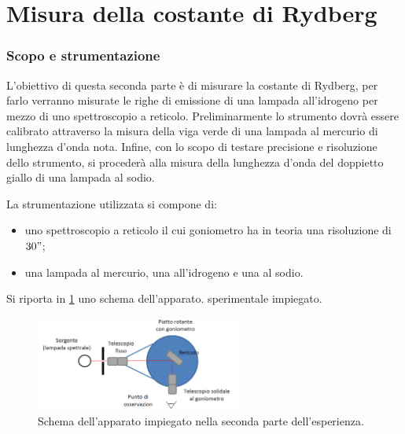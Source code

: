 \part{Misura della costante di Rydberg}
\section{Scopo e strumentazione}
	L'obiettivo di questa seconda parte è di misurare la costante di Rydberg, per farlo verranno misurate le righe di emissione di una lampada all'idrogeno per mezzo di uno spettroscopio a reticolo. Preliminarmente lo strumento dovrà essere calibrato attraverso la misura della viga verde di una lampada al mercurio di lunghezza d'onda nota.
	Infine, con lo scopo di testare precisione e risoluzione dello strumento, si procederà alla misura della lunghezza d'onda del doppietto giallo di una lampada al sodio.

La strumentazione utilizzata si compone di:
\begin{itemize}
	\item uno spettroscopio a reticolo il cui goniometro ha in teoria una risoluzione di $30"$;
	\item una lampada al mercurio, una all'idrogeno e una al sodio.
\end{itemize}

Si riporta in \figurename{ \ref{fig:reticolo}} uno schema dell'apparato.
sperimentale impiegato. 
\begin{figure} [!h]
	\centering
	\includegraphics[width=0.6\textwidth]{../Figs-tabs/reticolo.png}
	\caption{Schema dell'apparato impiegato nella seconda parte dell'esperienza.}
	\label{fig:reticolo}
\end{figure}
